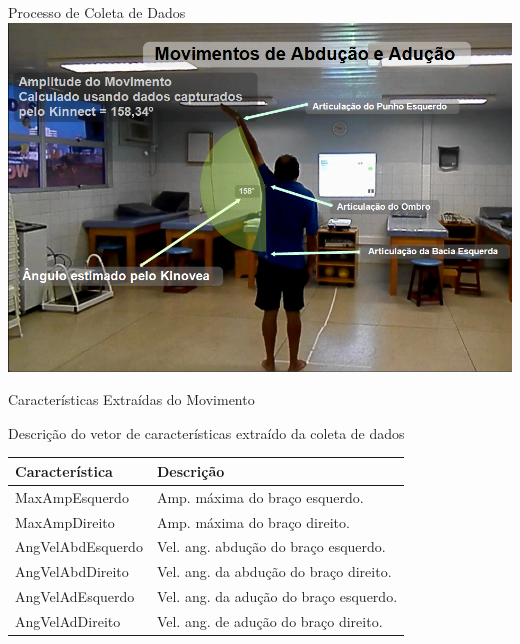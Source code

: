 \documentclass{beamer}
\begin{document}
\begin{frame}{Processo de Coleta de Dados}
      \center \includegraphics[height=2.6 in]{img/capturaducaokinnect.png}
\end{frame}

\begin{frame}{Características Extraídas do Movimento}
	\begin{block}{Descrição do vetor de características extraído da coleta de dados}
	\begin{table}[h]
	  \begin{tabular}{|l|l|}
	  \hline
	  {\bf Característica}  & {\bf Descrição}                                       \\ \hline
	  MaxAmpEsquerdo     & Amp. máxima do braço esquerdo. \\ \hline
	  MaxAmpDireito    & Amp. máxima do braço direito. \\ \hline
	  AngVelAbdEsquerdo  & Vel. ang. abdução do braço esquerdo. \\ \hline
	  AngVelAbdDireito & Vel. ang. da abdução do braço direito. \\ \hline
	  AngVelAdEsquerdo  & Vel. ang. da adução do braço esquerdo. \\ \hline
	  AngVelAdDireito & Vel. ang. de adução do braço direito. \\ \hline
	  \end{tabular}
	  \end{table}

	
	\end{block}
\end{frame}
\end{document}
